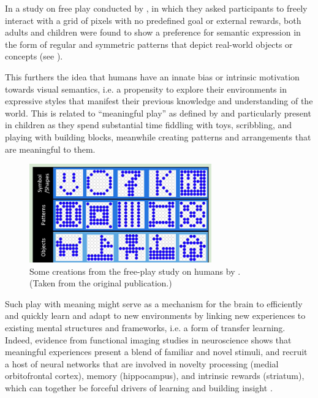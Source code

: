 In a study on free play conducted by \citet{diggs}, in which they asked participants to freely interact with a grid of pixels with no predefined goal or external rewards, both adults and children were found to show a preference for semantic expression in the form of regular and symmetric patterns that depict real-world objects or concepts (see ).

This furthers the idea that humans have an innate bias or intrinsic motivation towards visual semantics, i.e. a propensity to explore their environments in expressive styles that manifest their previous knowledge and understanding of the world.
This is related to ``meaningful play'' as defined by \citet{unesco} and particularly present in children as they spend substantial time fiddling with toys, scribbling, and playing with building blocks, meanwhile creating patterns and arrangements that are meaningful to them.

\begin{figure}[h]
    \centering
    \includegraphics[width=0.7\textwidth]{images/diggs.png}
    \captionsetup{justification=centering}
    \caption[Some creations from the free-play study on humans by \cite{diggs}.]{Some creations from the free-play study on humans by \cite{diggs}.\\(Taken from the original publication.)}
    \label{fig:diggs}
\end{figure}

Such play with meaning might serve as a mechanism for the brain to efficiently and quickly learn and adapt to new environments by linking new experiences to existing mental structures and frameworks, i.e. a form of transfer learning.
Indeed, evidence from functional imaging studies in neuroscience shows that meaningful experiences present a blend of familiar and novel stimuli, and recruit a host of neural networks that are involved in novelty processing (medial orbitofrontal cortex), memory (hippocampus), and intrinsic rewards (striatum), which can together be forceful drivers of learning \citep{neuronovel} and building insight \citep{insight}.

